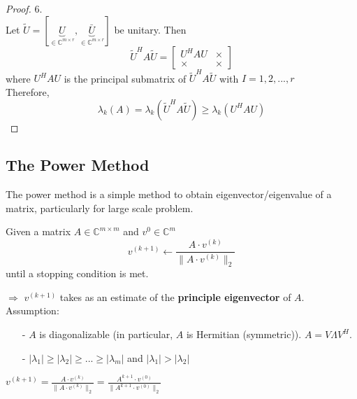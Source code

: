 \begin{multicols}{2}
\begin{proof} 6. \\
    Let $\tilde{U}=[\underbrace{U}_{\in\mathbb{C}^{m\times r}}, \underbrace{\bar{U}}_{\in\mathbb{C}^{m\times r}}]$ be unitary. Then
    \[
        \tilde{U}^HA\tilde{U} = \begin{bmatrix}
            U^HAU  & \times \\
            \times & \times
        \end{bmatrix}
    \]
    where $U^HAU$ is the principal submatrix of $\tilde{U}^HA\tilde{U}$ with $I={1,2,...,r}$\\
    Therefore, 
    \[
        \lambda_k(A) = \lambda_k(\tilde{U}^HA\tilde{U}) \geq \lambda_k(U^HAU)
    \]
\end{proof}

\subsection{The Power Method}
The power method is a simple method to obtain eigenvector/eigenvalue of a matrix, particularly for large scale problem.
\begin{algorithm}
Given a matrix $A\in\mathbb{C}^{m\times m}$ and $v^0\in\mathbb{C}^m$
\[
    v^{(k+1)}\leftarrow \frac{A\cdot v^{(k)}}{\|A\cdot v^{(k)}\|_2}
\]
until a stopping condition is met.
\end{algorithm}
$\Longrightarrow$ $v^{(k+1)}$ takes as an estimate of the \textbf{principle eigenvector} of $A$. \\
Assumption: 
\begin{itemize}
    \item [-] $A$ is diagonalizable (in particular, $A$ is Hermitian (symmetric)). $A=V\Lambda V^H$.
    \item [-] $|\lambda_1|\geq |\lambda_2|\geq ... \geq |\lambda_m|$ and $|\lambda_1|>|\lambda_2|$
\end{itemize}
$v^{(k+1)} = \frac{A\cdot v^{(k)}}{\|A\cdot v^{(k)}\|_2} = \frac{A^{k+1}\cdot v^{(0)}}{\|A^{k+1}\cdot v^{(0)}\|_2}$





\end{multicols}
